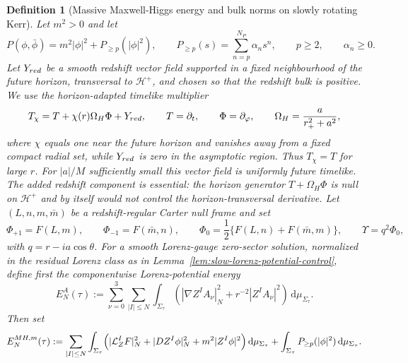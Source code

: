 \documentclass[10pt,a4paper]{amsart}
\newtheorem{definition}{Definition}
\newcommand{\dd}{\mathrm{d}}
\begin{document}
\begin{definition}[Massive Maxwell-Higgs energy and bulk norms on slowly rotating Kerr]\label{def:slow-massive-energy-norms}
Let \(m^2>0\) and let
\begin{equation}
 P(\phi,\bar\phi)=m^2|\phi|^2+P_{\ge p}(|\phi|^2),
 \qquad
 P_{\ge p}(s)=\sum_{n=p}^{N_P}\alpha_n s^n,
 \qquad p\ge2,
 \qquad \alpha_n\ge0.
\end{equation}
Let \(Y_{\rm red}\) be a smooth redshift vector field supported in a fixed neighbourhood of the future horizon, transversal to \(\mathcal H^+\), and chosen so that the redshift bulk is positive.  We use the horizon-adapted timelike multiplier
\begin{equation}\label{eq:Tchi-slow-definition}
 T_\chi=T+\chi(r)\Omega_H\Phi+Y_{\rm red},
 \qquad
 T=\partial_t,
 \qquad
 \Phi=\partial_\varphi,
 \qquad
 \Omega_H=\frac{a}{r_+^2+a^2},
\end{equation}
where \(\chi\) equals one near the future horizon and vanishes away from a fixed compact radial set, while \(Y_{\rm red}\) is zero in the asymptotic region.  Thus \(T_\chi=T\) for large \(r\).  For \(|a|/M\) sufficiently small this vector field is uniformly future timelike.  The added redshift component is essential: the horizon generator \(T+\Omega_H\Phi\) is null on \(\mathcal H^+\) and by itself would not control the horizon-transversal derivative.  Let \((L,n,m,\bar m)\) be a redshift-regular Carter null frame and set
\begin{equation}\label{eq:slow-maxwell-scalars}
 \Phi_{+1}=F(L,m),
 \qquad
 \Phi_{-1}=F(\bar m,n),
 \qquad
 \Phi_0=\frac12\{F(L,n)+F(\bar m,m)\},
 \qquad
 \Upsilon=q^2\Phi_0,
\end{equation}
with \(q=r-ia\cos\theta\).  For a smooth Lorenz-gauge zero-sector solution, normalized in the residual Lorenz class as in Lemma~\ref{lem:slow-lorenz-potential-control}, define first the componentwise Lorenz-potential energy
\begin{equation}\label{eq:slow-lorenz-potential-energy}
E_N^{A}(\tau):=
\sum_{\nu=0}^{3}\sum_{|I|\le N}\int_{\Sigma_\tau}
\left(|\nabla Z^IA_\nu|_N^2+r^{-2}|Z^IA_\nu|^2\right)\,\dd\mu_{\Sigma_\tau}.
\end{equation}
Then set
\begin{equation}
E_{N}^{MH,m}(\tau)
:=
\sum_{|I|\le N}\int_{\Sigma_\tau}
\Bigl(
 |\mathcal L_{Z}^{I}F|_{N}^{2}
 +|D Z^{I}\phi|_{N}^{2}
 +m^{2}|Z^{I}\phi|^{2}
\Bigr)\,\dd\mu_{\Sigma_\tau}
 +\int_{\Sigma_\tau}P_{\ge p}(|\phi|^{2})\,\dd\mu_{\Sigma_\tau}.
\label{eq:slow-energy-massive-def}

\end{equation}
\end{definition}
\end{document}
